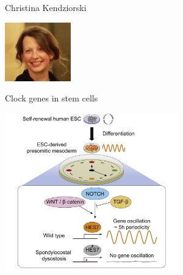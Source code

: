 \documentclass[12pt,t,aspectratio=169]{beamer}
\begin{document}
\begin{frame}{Christina Kendziorski}

\hspace*{0.85\textwidth}
\includegraphics[height=1in]{Pics/kendziorski.jpeg}
\vspace*{-30mm}

{\large Clock genes in stem cells}

\bigskip

\includegraphics[height=68mm]{Pics/kendziorski_cellclock.jpg}


\end{frame}
\end{document}
